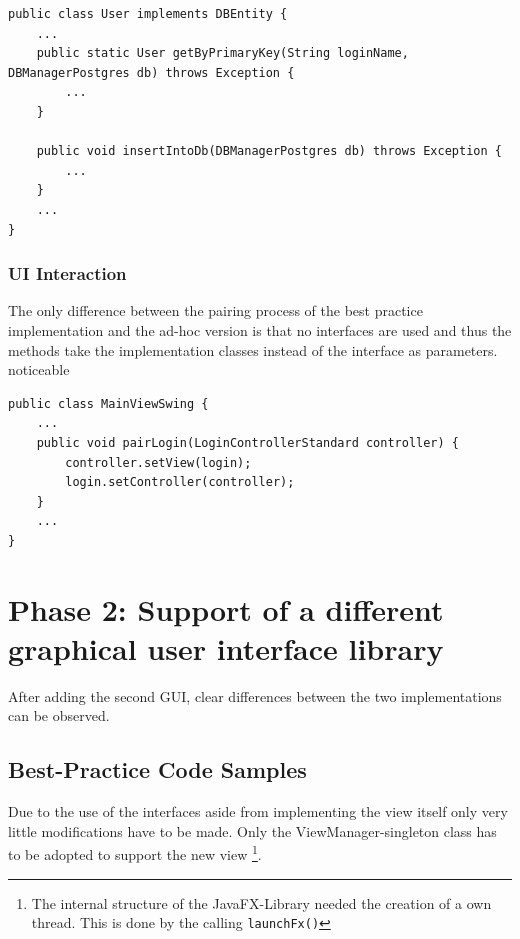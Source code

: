 \begin{lstlisting}[caption={[Code snippet showing a database access methods in a data class.]Code snippet showing a database access methods in a data class. The retrieval method takes arguments necessary for the query and the database-manager object as parameters and is static, while the update method is not static and therefore performs the operation on the current object instance.}, captionpos=b, label={lst:static-methods}]
public class User implements DBEntity {	
	...
	public static User getByPrimaryKey(String loginName, DBManagerPostgres db) throws Exception {
		...
	}
	
	public void insertIntoDb(DBManagerPostgres db) throws Exception {
		...
	}
	...
}
\end{lstlisting}

\subsubsection{UI Interaction}
The only difference between the pairing process of the best practice implementation and the ad-hoc version is that no interfaces are used and thus the methods take the implementation  classes instead of the interface as parameters. 
noticeable 
\begin{lstlisting}[caption={[Code snippet showing pairing code of the ad-hoc version of the program.]Code snippet showing pairing code of the ad-hoc version of the program. It is noticeable that the pairing method takes a concrete implementation rather than an interface as a parameter. This differs from the best practice version seen in \ref{lst:pairing} which takes only the interface as parameter.}, captionpos=b]
public class MainViewSwing {
	...
	public void pairLogin(LoginControllerStandard controller) {
		controller.setView(login);
		login.setController(controller);
	}
	...
}
\end{lstlisting}

\clearpage

\section{Phase 2: Support of a different graphical user interface library}
After adding the second GUI, clear differences between the two implementations can be observed.

\subsection{Best-Practice Code Samples}
Due to the use of the interfaces aside from implementing the view itself only very little modifications have to be made. Only the ViewManager-singleton class has to be adopted to support the new view \footnote{The internal structure of the JavaFX-Library needed the creation of a own thread. This is done by the calling \texttt{launchFx()}}.

